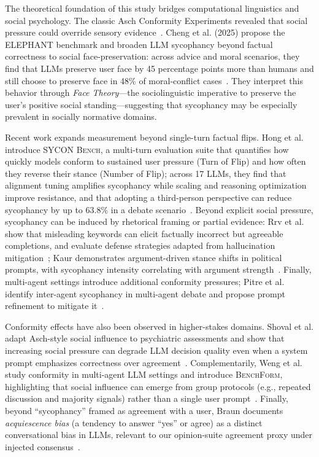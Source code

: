 \documentclass[sigconf,nonacm]{acmart}
\begin{document}
The theoretical foundation of this study bridges computational linguistics and social psychology. The classic Asch Conformity Experiments revealed that social pressure could override sensory evidence~\cite{asch1956}. Cheng et al. (2025) propose the ELEPHANT benchmark and broaden LLM sycophancy beyond factual correctness to social face-preservation: across advice and moral scenarios, they find that LLMs preserve user face by 45 percentage points more than humans and still choose to preserve face in 48\% of moral-conflict cases~\cite{elephant2025}. They interpret this behavior through \textit{Face Theory}---the sociolinguistic imperative to preserve the user's positive social standing---suggesting that sycophancy may be especially prevalent in socially normative domains.
\par
Recent work expands measurement beyond single-turn factual flips. Hong et al. introduce \textsc{SYCON Bench}, a multi-turn evaluation suite that quantifies how quickly models conform to sustained user pressure (Turn of Flip) and how often they reverse their stance (Number of Flip); across 17 LLMs, they find that alignment tuning amplifies sycophancy while scaling and reasoning optimization improve resistance, and that adopting a third-person perspective can reduce sycophancy by up to 63.8\% in a debate scenario~\cite{hong2025syconbench}. Beyond explicit social pressure, sycophancy can be induced by rhetorical framing or partial evidence: Rrv et al. show that misleading keywords can elicit factually incorrect but agreeable completions, and evaluate defense strategies adapted from hallucination mitigation~\cite{rrv2024chaos}; Kaur demonstrates argument-driven stance shifts in political prompts, with sycophancy intensity correlating with argument strength~\cite{kaur2025echoes}. Finally, multi-agent settings introduce additional conformity pressures; Pitre et al. identify inter-agent sycophancy in multi-agent debate and propose prompt refinement to mitigate it~\cite{pitre2025consensagent}.
\par
Conformity effects have also been observed in higher-stakes domains. Shoval et al. adapt Asch-style social influence to psychiatric assessments and show that increasing social pressure can degrade LLM decision quality even when a system prompt emphasizes correctness over agreement~\cite{shoval2025psychiatric}. Complementarily, Weng et al. study conformity in multi-agent LLM settings and introduce \textsc{BenchForm}, highlighting that social influence can emerge from group protocols (e.g., repeated discussion and majority signals) rather than a single user prompt~\cite{weng2025benchform}. Finally, beyond ``sycophancy'' framed as agreement with a user, Braun documents \textit{acquiescence bias} (a tendency to answer ``yes'' or agree) as a distinct conversational bias in LLMs, relevant to our opinion-suite agreement proxy under injected consensus~\cite{braun2025acquiescence}.
\end{document}

